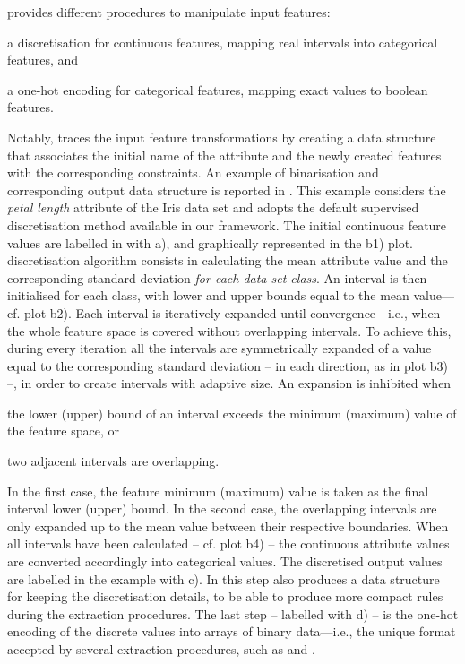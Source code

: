 \documentclass[12pt,a4paper,openright,twoside]{book}
\begin{document}
\psyke{} provides different procedures to manipulate input features:
%
\begin{inlinelist}
    \item a discretisation for continuous features, mapping real intervals into categorical features, and
    \item a one-hot encoding for categorical features, mapping exact values to boolean features.
\end{inlinelist}
%
Notably, \psyke{} traces the input feature transformations by creating a data structure that associates the initial name of the attribute and the newly created features with the corresponding constraints.
%
An example of \psyke{} binarisation and corresponding output data structure is reported in .
%
This example considers the \emph{petal length} attribute of the Iris data set and adopts the default supervised discretisation method available in our framework.
%
The initial continuous feature values are labelled in  with a), and graphically represented in the b1) plot.
%
\psyke{} discretisation algorithm consists in calculating the mean attribute value and the corresponding standard deviation \emph{for each data set class}.
%
An interval is then initialised for each class, with lower and upper bounds equal to the mean value---cf. plot b2).
%
Each interval is iteratively expanded until convergence---i.e., when the whole feature space is covered without overlapping intervals.
%
To achieve this, during every iteration all the intervals are symmetrically expanded of a value equal to the corresponding standard deviation -- in each direction, as in plot b3) --, in order to create intervals with adaptive size.
%
An expansion is inhibited when
%
\begin{inlinelist}
    \item the lower (upper) bound of an interval exceeds the minimum (maximum) value of the feature space, or
    \item two adjacent intervals are overlapping.
\end{inlinelist}
%
In the first case, the feature minimum (maximum) value is taken as the final interval lower (upper) bound.
%
In the second case, the overlapping intervals are only expanded up to the mean value between their respective boundaries.
%
When all intervals have been calculated -- cf. plot b4) -- the continuous attribute values are converted accordingly into categorical values.
%
The discretised output values are labelled in the example with c).
%
In this step \psyke{} also produces a data structure for keeping the discretisation details, to be able to produce more compact rules during the extraction procedures.
%
The last step -- labelled with d) -- is the one-hot encoding of the discrete values into arrays of binary data---i.e., the unique format accepted by several extraction procedures, such as \real{} and \trepan{}.
\end{document}
